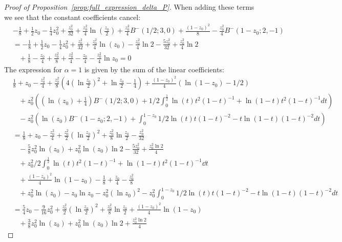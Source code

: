 \begin{proof}[Proof of Proposition~\ref{prop:full_expression_delta_P}]
When adding these terms we see that the constant coefficients cancel:
\begin{align*}
& -\frac{1}{8}+\frac{1}{2}z_0-\frac{1}{4}z_0^2+\frac{z_0^2}{32}+\frac{z_0^2}{4}\ln(\frac{z_0}{2}) +\frac{z_0^2}{4}B^-(1/2;3,0)+\frac{(1-z_0)^2}{8}-\frac{z_0^2}{4}B^-(1-z_0;2,-1) \\
&=-\frac{1}{8}+\frac{1}{2}z_0-\frac{1}{4}z_0^2+\frac{z_0^2}{32}+\frac{z_0^2}{4}\ln(z_0)-\frac{z_0^2}{4}\ln 2 -\frac{5z_0^2}{32}+\frac{z_0^2}{4}\ln2 \\ &\hspace{10pt}+\frac{1}{8}-\frac{z_0}{4}+\frac{z_0^2}{8}+\frac{z_0^2}{4}-\frac{z_0}{4}-\frac{z_0^2}{4}\ln z_0 =0
\end{align*}
The expression for $\alpha=1$ is given by the sum of the linear coefficients:
\begin{align*}
	&\frac{1}{8}+z_0-\frac{z_0^2}{4}+\frac{z_0^2}{8}(4(\ln\frac{z_0}{2})^2+\ln\frac{z_0}{2} - \frac{1}{4}) 
		+\frac{(1-z_0)^2}{4} (\ln(1-z_0)-1/2 )\\
	&\hspace{10pt}+z_0^2\left(\left(\ln(z_0)+\frac{1}{4}\right) B^-(1/2;3,0)+1/2\int_0^{\frac{1}{2}} 
		\ln(t)t^2(1-t)^{-1}+\ln(1-t)t^2(1-t)^{-1}dt \right) \\
	&\hspace{10pt}- z_0^{2}\left(\ln(z_0)B^-(1-z_0;2,-1)+\int_0^{1-z_0} 1/2\ln(t)t(1-t)^{-2}-t\ln(1-t)(1-t)^{-2}dt \right) \\
	&=\frac{1}{8}+z_0-\frac{z_0^2}{4}+\frac{z_0^2}{2}(\ln\frac{z_0}{2})^2
		+\frac{z_0^2}{8}\ln\frac{z_0}{2} - \frac{z_0^2}{32} \\
	&\hspace{10pt}-\frac{5}{8}z_0^2\ln(z_0)+z_0^2\ln(z_0)\ln 2-\frac{5z_0^2}{32} +\frac{z_0^2 \ln2}{4}\\
	&\hspace{10pt}+z_0^2/2\int_0^{\frac{1}{2}} \ln(t)t^2(1-t)^{-1}+\ln(1-t)t^2(1-t)^{-1}\dd t \\
	&\hspace{10pt}+\frac{(1-z_0)^2}{4}\ln(1-z_0) -\frac{1}{8}+\frac{z_0}{4}-\frac{z_0^2}{8}\\
	&\hspace{10pt}+ z_0^2\ln(z_0)-z_0 \ln z_0-z_0^2(\ln z_0)^2
		-z_0^2\int_0^{1-z_0} 1/2\ln(t)t(1-t)^{-2}-t\ln(1-t)(1-t)^{-2}dt \\
	&=\frac{5}{4}z_0-\frac{9}{16}z_0^2 +\frac{z_0^2}{2}(\ln\frac{z_0}{2})^2+\frac{z_0^2}{8}\ln\frac{z_0}{2} 
		+\frac{(1-z_0)^2}{4}\ln(1-z_0) \\
	&\hspace{10pt}+\frac{3}{8}z_0^2\ln(z_0)+z_0^2\ln(z_0)\ln 2+\frac{z_0^2 \ln2}{4}

\end{align*}
\end{proof}
